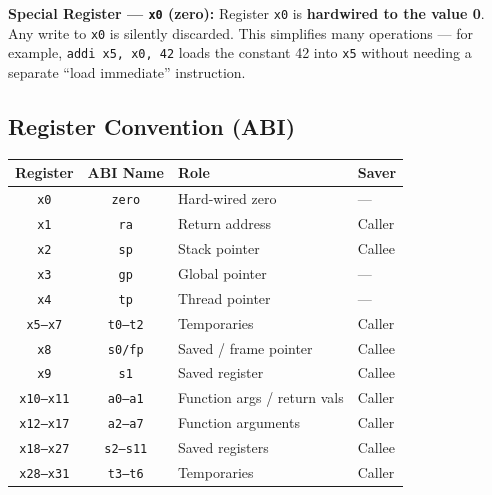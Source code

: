 \documentclass[12pt, a4paper, oneside]{book}
\begin{document}
\begin{keybox}
\textbf{\color{gold}Special Register --- \texttt{x0} (zero):}
Register \texttt{x0} is \textbf{hardwired to the value 0}. Any write to \texttt{x0} is silently discarded. This simplifies many operations --- for example, \texttt{addi x5, x0, 42} loads the constant 42 into \texttt{x5} without needing a separate ``load immediate'' instruction.
\end{keybox}

\subsection{Register Convention (ABI)}

\begin{center}
\renewcommand{\arraystretch}{1.2}
\footnotesize
\begin{tabular}{c c l l}
\toprule
\textbf{\color{purple}Register} & \textbf{\color{purple}ABI Name} & \textbf{\color{purple}Role} & \textbf{\color{purple}Saver} \\
\midrule
\texttt{x0}       & \texttt{zero} & Hard-wired zero               & --- \\
\texttt{x1}       & \texttt{ra}   & Return address                & Caller \\
\texttt{x2}       & \texttt{sp}   & Stack pointer                 & Callee \\
\texttt{x3}       & \texttt{gp}   & Global pointer                & --- \\
\texttt{x4}       & \texttt{tp}   & Thread pointer                & --- \\
\texttt{x5--x7}   & \texttt{t0--t2} & Temporaries                 & Caller \\
\texttt{x8}       & \texttt{s0/fp}  & Saved / frame pointer       & Callee \\
\texttt{x9}       & \texttt{s1}     & Saved register              & Callee \\
\texttt{x10--x11} & \texttt{a0--a1} & Function args / return vals & Caller \\
\texttt{x12--x17} & \texttt{a2--a7} & Function arguments          & Caller \\
\texttt{x18--x27} & \texttt{s2--s11}& Saved registers             & Callee \\
\texttt{x28--x31} & \texttt{t3--t6} & Temporaries                 & Caller \\
\bottomrule
\end{tabular}
\end{center}
\end{document}
